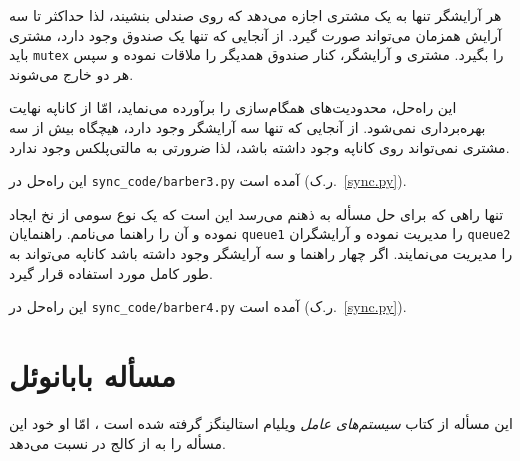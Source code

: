 \documentclass{book}
\newcommand{\clearemptydoublepage}{}%
\begin{document}
    هر آرایشگر تنها به یک مشتری اجازه می‌دهد که روی صندلی بنشیند، لذا حداکثر تا سه آرایش همزمان می‌تواند صورت گیرد. از آنجایی که تنها یک صندوق وجود 
    دارد، مشتری باید  {\tt mutex} را بگیرد. مشتری و آرایشگر، کنار صندوق همدیگر را ملاقات نموده و سپس هر دو خارج می‌شوند. 

    این راه‌حل،‌ محدودیت‌های همگام‌سازی را برآورده می‌نماید،‌ امّا از کاناپه نهایت بهره‌برداری نمی‌شود. 
    از آنجایی که تنها سه آرایشگر وجود دارد، هیچگاه بیش از سه مشتری نمی‌تواند روی کاناپه وجود داشته باشد، لذا ضرورتی به مالتی‌پلکس وجود ندارد. 

    این راه‌حل در \verb"sync_code/barber3.py" آمده است (ر.ک.~\ref{sync.py}).


    تنها راهی که برای حل مسأله به ذهنم می‌رسد این است که یک نوع سومی از نخ ایجاد نموده و آن را راهنما می‌نامم. 
    راهنمایان {\tt queue1} را مدیریت نموده و آرایشگران {\tt queue2} را مدیریت می‌نمایند. اگر چهار راهنما و سه آرایشگر وجود داشته باشد 
    کاناپه می‌تواند به طور کامل مورد استفاده قرار گیرد. 

    این راه‌حل در \verb"sync_code/barber4.py" آمده است (ر.ک.~\ref{sync.py}).


\clearemptydoublepage
\section{مسأله بابانوئل}

    این مسأله از کتاب \emph{سیستم‌های عامل} ویلیام استالینگز گرفته شده است  \cite{stallings}، امّا او خود این مسأله را به 
    از کالج   در  نسبت می‌دهد. 

\end{document}

